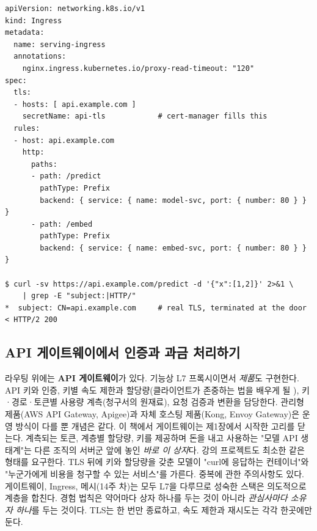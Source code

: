 \begin{terminalbox}
\begin{Verbatim}[breaklines=true,breakanywhere=true,fontsize=\small,formatcom=\color{tbbtermfg},codes=\tbbcodeactive]
apiVersion: networking.k8s.io/v1
kind: Ingress
metadata:
  name: serving-ingress
  annotations:
    nginx.ingress.kubernetes.io/proxy-read-timeout: "120"
spec:
  tls:
  - hosts: [ api.example.com ]
    secretName: api-tls            # cert-manager fills this
  rules:
  - host: api.example.com
    http:
      paths:
      - path: /predict
        pathType: Prefix
        backend: { service: { name: model-svc, port: { number: 80 } } }
      - path: /embed
        pathType: Prefix
        backend: { service: { name: embed-svc, port: { number: 80 } } }

$ curl -sv https://api.example.com/predict -d '{"x":[1,2]}' 2>&1 \
    | grep -E "subject:|HTTP/"
*  subject: CN=api.example.com     # real TLS, terminated at the door
< HTTP/2 200
\end{Verbatim}
\end{terminalbox}

\subsection*{API 게이트웨이에서 인증과 과금 처리하기}

라우팅 위에는 \textbf{API 게이트웨이}가 있다. 기능상 L7 프록시이면서 \textit{제품}도 구현한다. API 키와 인증, 키별 속도 제한과 할당량(클라이언트가 존중하는 법을 배우게 될 ), 키·경로·토큰별 사용량 계측(청구서의 원재료), 요청 검증과 변환을 담당한다. 관리형 제품(AWS API Gateway, Apigee)과 자체 호스팅 제품(Kong, Envoy Gateway)은 운영 방식이 다를 뿐 개념은 같다. 이 책에서 게이트웨이는 제1장에서 시작한 고리를 닫는다. 계측되는 토큰, 계층별 할당량, 키를 제공하며 돈을 내고 사용하는 "모델 API 생태계"는 다른 조직의 서버군 앞에 놓인 \textit{바로 이 상자}다. 강의 프로젝트도 최소한 같은 형태를 요구한다. TLS 뒤에 키와 할당량을 갖춘 모델이 "curl에 응답하는 컨테이너"와 "누군가에게 비용을 청구할 수 있는 서비스"를 가른다. 중복에 관한 주의사항도 있다. 게이트웨이, Ingress, 메시(14주 차)는 모두 L7을 다루므로 성숙한 스택은 의도적으로 계층을 합친다. 경험 법칙은 약어마다 상자 하나를 두는 것이 아니라 \textit{관심사마다 소유자 하나}를 두는 것이다. TLS는 한 번만 종료하고, 속도 제한과 재시도는 각각 한곳에만 둔다.

